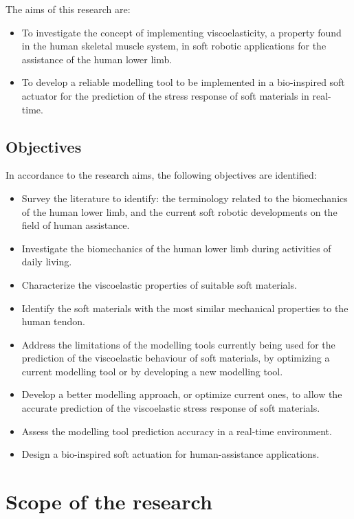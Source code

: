 The aims of this research are:

\begin{itemize}
    \item To investigate the concept of implementing viscoelasticity, a property found in the human skeletal muscle system, in soft robotic applications for the assistance of the human lower limb.
    \item To develop a reliable modelling tool to be implemented in a bio-inspired soft actuator for the prediction of the stress response of soft materials in real-time.
\end{itemize}

\subsection{Objectives}

In accordance to the research aims, the following objectives are identified:

\begin{itemize}
    \item Survey the literature to identify: the terminology related to the biomechanics of the human lower limb, and the current soft robotic developments on the field of human assistance.
    \item Investigate the biomechanics of the human lower limb during activities of daily living.
    \item Characterize the viscoelastic properties of suitable soft materials.
    \item Identify the soft materials with the most similar mechanical properties to the human tendon.
    \item Address the limitations of the modelling tools currently being used for the prediction of the viscoelastic behaviour of soft materials, by optimizing a current modelling tool or by developing a new modelling tool.
    \item Develop a better modelling approach, or optimize current ones, to allow the accurate prediction of the viscoelastic stress response of soft materials.
    \item Assess the modelling tool prediction accuracy in a real-time environment.
    \item Design a bio-inspired soft actuation for human-assistance applications.
\end{itemize}

\section{Scope of the research}

